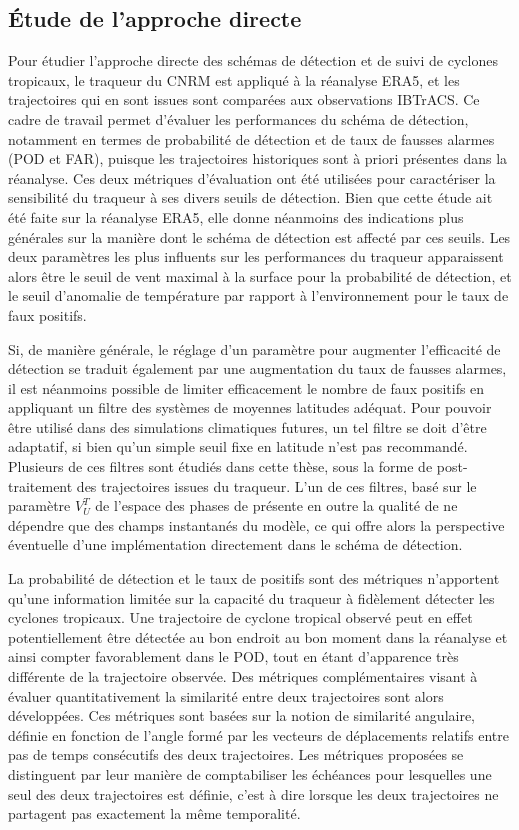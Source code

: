 \documentclass[../main.tex]{subfiles}
\begin{document}
\subsection*{Étude de l'approche directe}

Pour étudier l'approche directe des schémas de détection et de suivi de cyclones tropicaux, le traqueur du CNRM est appliqué à la réanalyse ERA5, et les
trajectoires qui en sont issues sont comparées aux observations IBTrACS. Ce cadre de travail permet d'évaluer les performances du schéma de détection, notamment
en termes de probabilité de détection et de taux de fausses alarmes (POD et FAR), puisque les trajectoires historiques sont à priori présentes dans la
réanalyse. Ces deux métriques d'évaluation ont été utilisées pour caractériser la sensibilité du traqueur à ses divers seuils de détection. Bien que cette étude
ait été faite sur la réanalyse ERA5, elle donne néanmoins des indications plus générales sur la manière dont le schéma de détection est affecté par ces seuils.
Les deux paramètres les plus influents sur les performances du traqueur apparaissent alors être le seuil de vent maximal à la surface pour la probabilité de
détection, et le seuil d'anomalie de température par rapport à l'environnement pour le taux de faux positifs.

Si, de manière générale, le réglage d'un paramètre pour augmenter l'efficacité de détection se traduit également par une augmentation du taux de fausses
alarmes, il est néanmoins possible de limiter efficacement le nombre de faux positifs en appliquant un filtre des systèmes de moyennes latitudes adéquat. Pour
pouvoir être utilisé dans des simulations climatiques futures, un tel filtre se doit d'être adaptatif, si bien qu'un simple seuil fixe en latitude n'est pas
recommandé. Plusieurs de ces filtres sont étudiés dans cette thèse, sous la forme de post-traitement des trajectoires issues du traqueur. L'un de ces filtres,
basé sur le paramètre $V_U^T$ de l'espace des phases de \textcite{hart_cyclone_2003} présente en outre la qualité de ne dépendre que des champs instantanés du
modèle, ce qui offre alors la perspective éventuelle d'une implémentation directement dans le schéma de détection.

La probabilité de détection et le taux de positifs sont des métriques n'apportent qu'une information limitée sur la capacité du traqueur à fidèlement détecter
les cyclones tropicaux. Une trajectoire de cyclone tropical observé peut en effet potentiellement être détectée au bon endroit au bon moment dans la réanalyse
et ainsi compter favorablement dans le POD, tout en étant d'apparence très différente de la trajectoire observée. Des métriques complémentaires visant à évaluer
quantitativement la similarité entre deux trajectoires sont alors développées. Ces métriques sont basées sur la notion de similarité angulaire, définie en
fonction de l'angle formé par les vecteurs de déplacements relatifs entre pas de temps consécutifs des deux trajectoires. Les métriques proposées se distinguent
par leur manière de comptabiliser les échéances pour lesquelles une seul des deux trajectoires est définie, c'est à dire lorsque les deux trajectoires ne
partagent pas exactement la même temporalité. 
\end{document}
